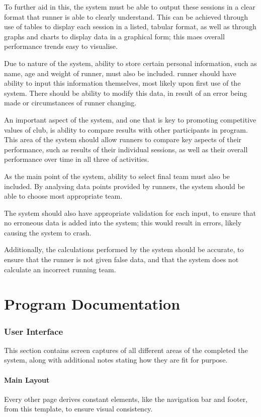 \documentclass{article}[12pt,a4paper]
\begin{document}
To further aid in this, the system must be able to output these sessions in a clear format that runner is able to clearly understand. This can be achieved through use of tables to display each session in a listed, tabular format, as well as through graphs and charts to display data in a graphical form; this maes overall performance trends easy to visualise.

Due to nature of the system, ability to store certain personal information, such as name, age and weight of runner, must also be included. runner should have ability to input this information themselves, most likely upon first use of the system. There should be ability to modify this data, in result of an error being made or circumstances of runner changing.

An important aspect of the system, and one that is key to promoting competitive values of club, is ability to compare results with other participants in program. This area of the system should allow runners to compare key aspects of their performance, such as results of their individual sessions, as well as their overall performance over time in all three of activities.

As the main point of the system, ability to select final team must also be included. By analysing data points provided by runners, the system should be able to choose most appropriate team.

The system should also have appropriate validation for each input, to ensure that no erroneous data is added into the system; this would result in errors, likely causing the system to crash.

Additionally, the calculations performed by the system should be accurate, to ensure that the runner is not given false data, and that the system does not calculate an incorrect running team.

\cleardoublepage


\part{Program Documentation}

\section{User Interface}
This section contains screen captures of all different areas of the completed the system, along with additional notes stating how they are fit for purpose.

\subsection{Main Layout}
Every other page derives constant elements, like the navigation bar and footer, from this template, to ensure visual consistency.
\end{document}
